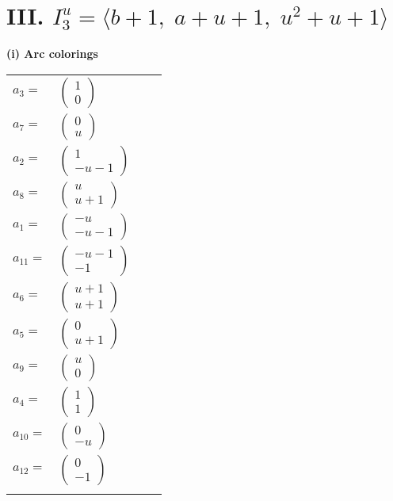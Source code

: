 \documentclass[1p]{elsarticle_modified}
\theoremstyle{definition}
\begin{document}
\centering \section*{III. $I^u_{3}= \langle b+1,\;a+u+1,\;u^2+u+1 \rangle$}
\flushleft \textbf{(i) Arc colorings}\\
\begin{tabular}{m{7pt} m{180pt} m{7pt} m{180pt} }
\flushright $a_{3}=$&$\begin{pmatrix}1\\0\end{pmatrix}$ \\
\flushright $a_{7}=$&$\begin{pmatrix}0\\u\end{pmatrix}$ \\
\flushright $a_{2}=$&$\begin{pmatrix}1\\- u-1\end{pmatrix}$ \\
\flushright $a_{8}=$&$\begin{pmatrix}u\\u+1\end{pmatrix}$ \\
\flushright $a_{1}=$&$\begin{pmatrix}- u\\- u-1\end{pmatrix}$ \\
\flushright $a_{11}=$&$\begin{pmatrix}- u-1\\-1\end{pmatrix}$ \\
\flushright $a_{6}=$&$\begin{pmatrix}u+1\\u+1\end{pmatrix}$ \\
\flushright $a_{5}=$&$\begin{pmatrix}0\\u+1\end{pmatrix}$ \\
\flushright $a_{9}=$&$\begin{pmatrix}u\\0\end{pmatrix}$ \\
\flushright $a_{4}=$&$\begin{pmatrix}1\\1\end{pmatrix}$ \\
\flushright $a_{10}=$&$\begin{pmatrix}0\\- u\end{pmatrix}$ \\
\flushright $a_{12}=$&$\begin{pmatrix}0\\-1\end{pmatrix}$\\&\end{tabular}
\end{document}
